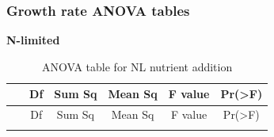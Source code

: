 \documentclass[]{article}
\begin{document}
\newpage

\subsubsection{Growth rate ANOVA tables}\label{growth-rate-anova-tables}

\textbf{N-limited}

\begin{longtable}[]{@{}cccccc@{}}
\caption{ANOVA table for NL nutrient addition}\tabularnewline
\toprule
\begin{minipage}[b]{0.19\columnwidth}\centering\strut
~
\strut\end{minipage} &
\begin{minipage}[b]{0.06\columnwidth}\centering\strut
Df
\strut\end{minipage} &
\begin{minipage}[b]{0.10\columnwidth}\centering\strut
Sum Sq
\strut\end{minipage} &
\begin{minipage}[b]{0.12\columnwidth}\centering\strut
Mean Sq
\strut\end{minipage} &
\begin{minipage}[b]{0.12\columnwidth}\centering\strut
F value
\strut\end{minipage} &
\begin{minipage}[b]{0.12\columnwidth}\centering\strut
Pr(\textgreater{}F)
\strut\end{minipage}\tabularnewline
\midrule
\endfirsthead
\toprule
\begin{minipage}[b]{0.19\columnwidth}\centering\strut
~
\strut\end{minipage} &
\begin{minipage}[b]{0.06\columnwidth}\centering\strut
Df
\strut\end{minipage} &
\begin{minipage}[b]{0.10\columnwidth}\centering\strut
Sum Sq
\strut\end{minipage} &
\begin{minipage}[b]{0.12\columnwidth}\centering\strut
Mean Sq
\strut\end{minipage} &
\begin{minipage}[b]{0.12\columnwidth}\centering\strut
F value
\strut\end{minipage} &
\begin{minipage}[b]{0.12\columnwidth}\centering\strut
Pr(\textgreater{}F)
\strut\end{minipage}\tabularnewline
\midrule
\endhead
\begin{minipage}[t]{0.19\columnwidth}\centering\strut

\end{minipage}
\end{longtable}
\end{document}

